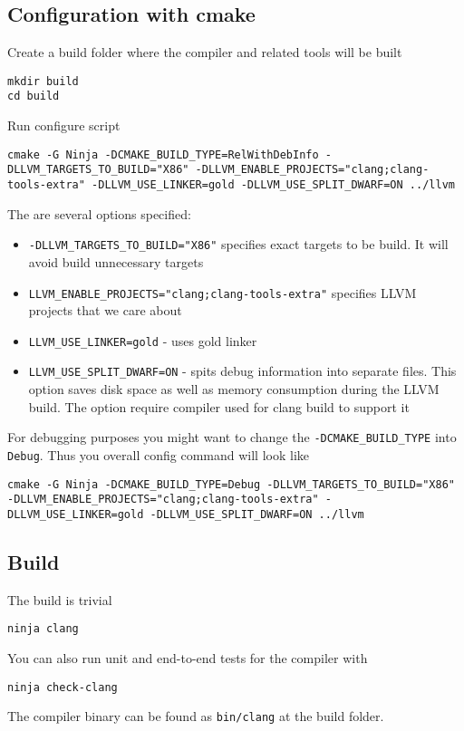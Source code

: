 \subsection{Configuration with cmake}
Create a build folder where the compiler and related tools will be
built
\begin{verbatim}
mkdir build
cd build
\end{verbatim}
Run configure script
\begin{verbatim}
cmake -G Ninja -DCMAKE_BUILD_TYPE=RelWithDebInfo -DLLVM_TARGETS_TO_BUILD="X86" -DLLVM_ENABLE_PROJECTS="clang;clang-tools-extra" -DLLVM_USE_LINKER=gold -DLLVM_USE_SPLIT_DWARF=ON ../llvm
\end{verbatim}
The are several options specified:
\begin{itemize}
  \item \texttt{-DLLVM_TARGETS_TO_BUILD="X86"} specifies exact
    targets to be build. It will avoid build unnecessary targets
  \item \texttt{LLVM_ENABLE_PROJECTS="clang;clang-tools-extra"}
    specifies LLVM projects that we care about
\item \texttt{LLVM_USE_LINKER=gold} - uses gold linker
\item \texttt{LLVM_USE_SPLIT_DWARF=ON} - spits debug information into
  separate files. This option saves disk space as well as memory
  consumption during the LLVM build. The option require compiler used
  for clang build to support it
\end{itemize}
For debugging purposes you might want to change the
\texttt{-DCMAKE_BUILD_TYPE} into
\texttt{Debug}. Thus you overall config command will look
like
\begin{verbatim}
cmake -G Ninja -DCMAKE_BUILD_TYPE=Debug -DLLVM_TARGETS_TO_BUILD="X86" -DLLVM_ENABLE_PROJECTS="clang;clang-tools-extra" -DLLVM_USE_LINKER=gold -DLLVM_USE_SPLIT_DWARF=ON ../llvm
\end{verbatim}


\subsection{Build}
The build is trivial
\begin{verbatim}
ninja clang
\end{verbatim}
You can also run unit and end-to-end tests for the compiler with
\begin{verbatim}
ninja check-clang
\end{verbatim}
The compiler binary can be found as \texttt{bin/clang} at the build folder. 
